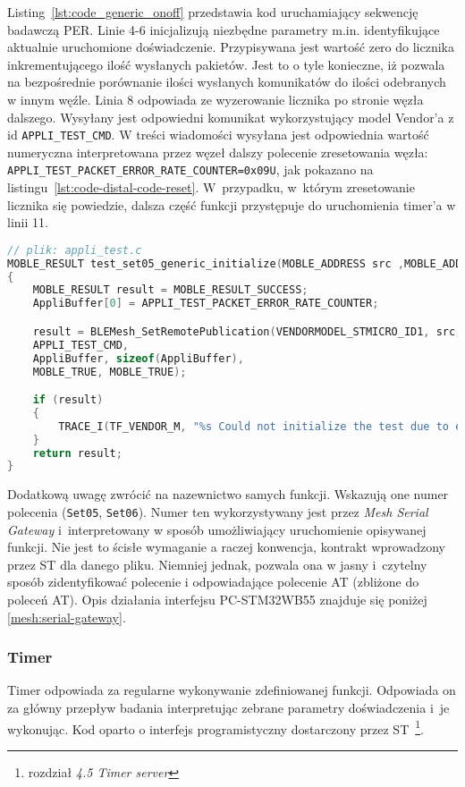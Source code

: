 Listing~\ref{lst:code_generic_onoff} przedstawia kod uruchamiający sekwencję badawczą PER. Linie 4-6 inicjalizują niezbędne
parametry m.in. identyfikujące aktualnie uruchomione doświadczenie. Przypisywana jest wartość zero do licznika inkrementującego
ilość wysłanych pakietów. Jest to o tyle  konieczne, iż pozwala na bezpośrednie porównanie ilości wysłanych komunikatów do
ilości odebranych w innym węźle. Linia 8 odpowiada ze wyzerowanie licznika po stronie węzła dalszego. Wysyłany jest odpowiedni
komunikat wykorzystujący model Vendor'a z id \texttt{APPLI\_TEST\_CMD}. W treści wiadomości wysyłana jest odpowiednia wartość numeryczna
interpretowana przez węzeł dalszy polecenie zresetowania węzła: \texttt{APPLI\_TEST\_PACKET\_ERROR\_RATE\_COUNTER=0x09U}, jak
pokazano na listingu~\ref{lst:code-distal-code-reset}.
W~przypadku, w~którym zresetowanie licznika się powiedzie, dalsza część funkcji przystępuje do uruchomienia timer'a
w linii 11.

\begin{lstlisting}[language=C,
    caption={Kod resetujący wartość licznika w węźle dystalnym},
    label={lst:code-distal-code-reset}]
// plik: appli_test.c
MOBLE_RESULT test_set05_generic_initialize(MOBLE_ADDRESS src ,MOBLE_ADDRESS dst)
{
	MOBLE_RESULT result = MOBLE_RESULT_SUCCESS;
	AppliBuffer[0] = APPLI_TEST_PACKET_ERROR_RATE_COUNTER;

	result = BLEMesh_SetRemotePublication(VENDORMODEL_STMICRO_ID1, src,
	APPLI_TEST_CMD,
	AppliBuffer, sizeof(AppliBuffer),
	MOBLE_TRUE, MOBLE_TRUE);

	if (result)
	{
		TRACE_I(TF_VENDOR_M, "%s Could not initialize the test due to error code=%d \r\n", OP_NAME_SET05, result);
	}
	return result;
}
\end{lstlisting}

Dodatkową uwagę zwrócić na nazewnictwo samych funkcji. Wskazują one numer polecenia (\texttt{Set05}, \texttt{Set06}). Numer ten wykorzystywany
jest przez \textit{Mesh Serial Gateway} i~interpretowany w sposób umożliwiający uruchomienie opisywanej funkcji. 
Nie jest to ścisłe wymaganie a raczej konwencja, kontrakt wprowadzony przez ST dla danego pliku. Niemniej jednak, pozwala
ona w jasny i~czytelny sposób zidentyfikować polecenie i odpowiadające polecenie \gls{AT} (zbliżone do poleceń AT). Opis
działania interfejsu PC-STM32WB55 znajduje się poniżej \ref{mesh:serial-gateway}.

\subsubsection{Timer}\label{sec:timer}
Timer odpowiada za regularne wykonywanie zdefiniowanej funkcji. Odpowiada on za główny przepływ 
badania interpretując zebrane parametry doświadczenia i~je wykonując. Kod oparto o interfejs programistyczny
dostarczony przez ST~\cite{stmicroelectronics_an5289_2021}\footnote{rozdział \textit{4.5 Timer server}}.

